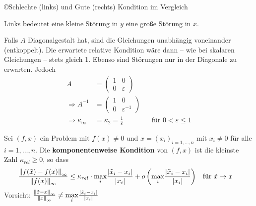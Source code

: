 \begin{Bspe}
\begin{image}{\copyright Schlechte (links) und Gute (rechts)
      Kondition im Vergleich}
    Links bedeutet eine kleine Störung in $y$ eine große Störung in $x$.
  \end{image}
\end{Bspe}



\begin{Bspe}
  Falls $A$ Diagonalgestalt hat, sind die Gleichungen 
  unabhängig voneinander (entkoppelt).
  Die erwartete relative Kondition wäre dann 
  – wie bei skalaren Gleichungen – stets gleich 1.
  Ebenso sind Störungen nur in der Diagonale zu erwarten. Jedoch
  \begin{align*}
    A  &=\begin{pmatrix}
      1 & 0\\
      0 & \varepsilon
    \end{pmatrix} \\
    \Rightarrow 	A^{-1}&=\begin{pmatrix}
      1 & 0\\
      0 & \varepsilon^{-1}
    \end{pmatrix}\\
    \Rightarrow \kappa_\infty& = \kappa_2 = \frac{1}{\varepsilon} 
        && \text{für }0 < \varepsilon \leq 1
  \end{align*}
\end{Bspe}

\begin{Defe}
  Sei $(f, x) $ ein Problem mit $f(x)\neq 0$ 
  und $x=(x_i)_{i=1,\dotsc , n}$ mit $x_i\neq 0 $  für alle $i=1,\dotsc, n$.
  Die \textbf{komponentenweise Kondition} von $(f,x)$
  ist die kleinste Zahl $\kappa_{rel}\geq 0$, so dass
  \begin{align*}
    \frac{\nn[f(\tilde{x})-f(x)]_\infty}{\nn[f(x)]_\infty} 
    &\leq \kappa_{rel} 
      \cdot \underset{i}{\max}
      \frac{|\tilde{x}_i-x_i|}{|x_i|}
      + o\left(\underset{i}{\max}\frac{|\tilde{x}_i-x_i|}{|x_i|}\right) 
    && \text{für }\tilde{x}\to x
  \end{align*}
  Vorsicht:
$
    \frac{\nn[\tilde{x}-x]_\infty}{\nn[x]_\infty}
    \neq \underset{i}{\max}\frac{|\tilde{x}_i-x_i|}{|x_i|}
$
\end{Defe}

